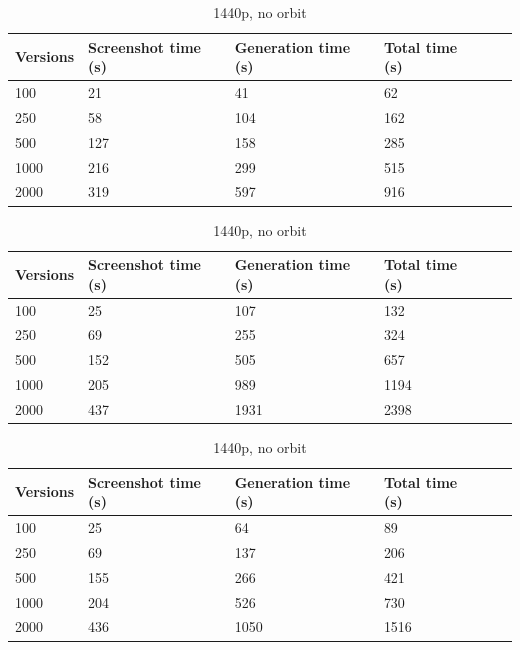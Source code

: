 \documentclass[]{usiinfbachelorproject}
\begin{document}
\begin{table}[H]
    \begin{center}
        \begin{tabular}{ | l | l | l | l | l | l |}
        \hline
        Versions & Screenshot time (s) & Generation time (s)& Total time (s) \\ \hline
        100 & 21 & 41 & 62 \\ \hline
        250 & 58 & 104 & 162\\ \hline
        500 & 127 & 158 & 285\\ \hline
        1000 & 216 & 299 & 515\\ \hline
        2000 & 319 & 597 & 916\\ \hline
        \end{tabular}
    \end{center}
    \caption{1080p, no orbit}
    \label{tab:performance}

    \begin{center}
        \begin{tabular}{ | l | l | l | l | l | l |}
        \hline
        Versions & Screenshot time (s) & Generation time (s)& Total time (s) \\ \hline
        100 & 25 & 107 & 132 \\ \hline
        250 & 69 & 255 & 324\\ \hline
        500 & 152 & 505 & 657\\ \hline
        1000 & 205 & 989 & 1194\\ \hline
        2000 & 437 & 1931 & 2398\\ \hline
        \end{tabular}
    \end{center}
    \caption{1440p, orbit}
    \label{tab:performance}

    \begin{center}
        \begin{tabular}{ | l | l | l | l | l | l |}
        \hline
        Versions & Screenshot time (s) & Generation time (s)& Total time (s) \\ \hline
        100 & 25 & 64 & 89 \\ \hline
        250 & 69 & 137 & 206\\ \hline
        500 & 155 & 266 & 421\\ \hline
        1000 & 204 & 526 & 730\\ \hline
        2000 & 436 & 1050 & 1516\\ \hline
        \end{tabular}
    \end{center}
    \caption{1440p, no orbit}
    \label{tab:performance}
\end{table}
\end{document}
